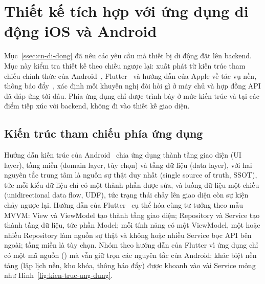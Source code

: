 \section{Thiết kế tích hợp với ứng dụng di động iOS và Android}\label{sec:tich-hop-di-dong}

Mục~\ref{ssec:cn-di-dong} đã nêu các yêu cầu mà thiết bị di động đặt lên backend. Mục này kiểm tra thiết kế theo chiều ngược lại: xuất phát từ kiến trúc tham chiếu chính thức của Android~\cite{androidarch}, Flutter~\cite{flutterarch} và hướng dẫn của Apple về tác vụ nền, thông báo đẩy~\cite{applebgtasks,appleapns}, xác định mỗi khuyến nghị đòi hỏi gì ở máy chủ và hợp đồng API đã đáp ứng tới đâu. Phía ứng dụng chỉ được trình bày ở mức kiến trúc và tại các điểm tiếp xúc với backend, không đi vào thiết kế giao diện.

\subsection{Kiến trúc tham chiếu phía ứng dụng}\label{ssec:kien-truc-tham-chieu}

Hướng dẫn kiến trúc của Android~\cite{androidarch} chia ứng dụng thành tầng giao diện (UI layer), tầng miền (domain layer, tùy chọn) và tầng dữ liệu (data layer), với hai nguyên tắc trung tâm là nguồn sự thật duy nhất (single source of truth, SSOT), tức mỗi kiểu dữ liệu chỉ có một thành phần được sửa, và luồng dữ liệu một chiều (unidirectional data flow, UDF), tức trạng thái chảy lên giao diện còn sự kiện chảy ngược lại. Hướng dẫn của Flutter~\cite{flutterarch} cụ thể hóa cùng tư tưởng theo mẫu MVVM: View và ViewModel tạo thành tầng giao diện; Repository và Service tạo thành tầng dữ liệu, tức phần Model; mỗi tính năng có một ViewModel, một hoặc nhiều Repository làm nguồn sự thật và không hoặc nhiều Service bọc API bên ngoài; tầng miền là tùy chọn. Nhóm theo hướng dẫn của Flutter vì ứng dụng chỉ có một mã nguồn () mà vẫn giữ trọn các nguyên tắc của Android; khác biệt nền tảng (lập lịch nền, kho khóa, thông báo đẩy) được khoanh vào vài Service mỏng như Hình~\ref{fig:kien-truc-ung-dung}.


